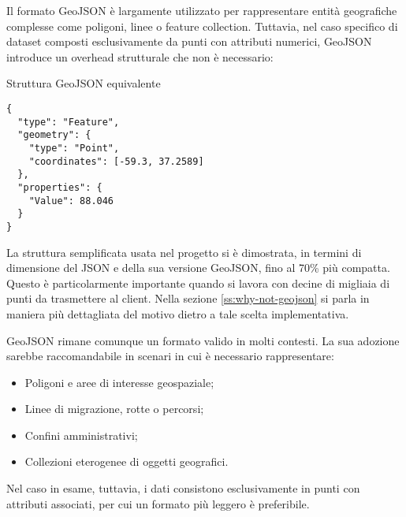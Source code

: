 Il formato GeoJSON è largamente utilizzato per rappresentare entità geografiche complesse come poligoni, linee o feature collection. Tuttavia, nel caso specifico di dataset composti esclusivamente da punti con attributi numerici, GeoJSON introduce un overhead strutturale che non è necessario:

\begin{listing}[H]
\caption{Struttura GeoJSON equivalente}
\label{lst:geojson_equivalent_structure} %
\begin{verbatim}
{
  "type": "Feature",
  "geometry": {
    "type": "Point",
    "coordinates": [-59.3, 37.2589]
  },
  "properties": {
    "Value": 88.046
  }
}
\end{verbatim}
\end{listing}

La struttura semplificata usata nel progetto si è dimostrata, in termini di dimensione del JSON e della sua versione GeoJSON, fino al 70\% più compatta. Questo è particolarmente importante quando si lavora con decine di migliaia di punti da trasmettere al client. Nella sezione \ref{ss:why-not-geojson} si parla in maniera più dettagliata del motivo dietro a tale scelta implementativa.

GeoJSON rimane comunque un formato valido in molti contesti. La sua adozione sarebbe raccomandabile in scenari in cui è necessario rappresentare:

\begin{itemize}
  \item Poligoni e aree di interesse geospaziale;
  \item Linee di migrazione, rotte o percorsi;
  \item Confini amministrativi;
  \item Collezioni eterogenee di oggetti geografici.
\end{itemize}

Nel caso in esame, tuttavia, i dati consistono esclusivamente in punti con attributi associati, per cui un formato più leggero è preferibile.